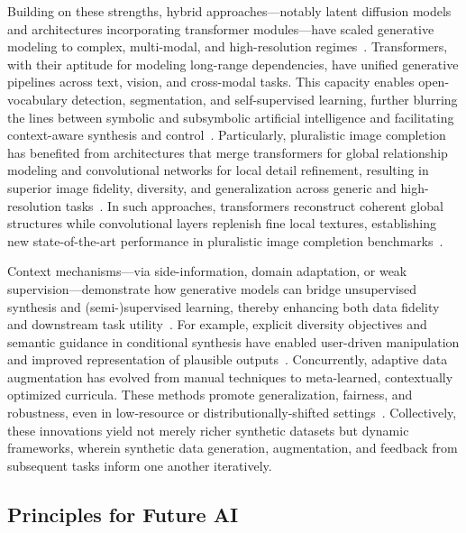 \documentclass[sigconf]{acmart}
\begin{document}
Building on these strengths, hybrid approaches---notably latent diffusion models and architectures incorporating transformer modules---have scaled generative modeling to complex, multi-modal, and high-resolution regimes~\cite{ref97,ref102}. Transformers, with their aptitude for modeling long-range dependencies, have unified generative pipelines across text, vision, and cross-modal tasks. This capacity enables open-vocabulary detection, segmentation, and self-supervised learning, further blurring the lines between symbolic and subsymbolic artificial intelligence and facilitating context-aware synthesis and control~\cite{ref93,ref95,ref100,ref102,ref81,ref83}. Particularly, pluralistic image completion has benefited from architectures that merge transformers for global relationship modeling and convolutional networks for local detail refinement, resulting in superior image fidelity, diversity, and generalization across generic and high-resolution tasks~\cite{ref92,ref97,ref102}. In such approaches, transformers reconstruct coherent global structures while convolutional layers replenish fine local textures, establishing new state-of-the-art performance in pluralistic image completion benchmarks~\cite{ref92}.

Context mechanisms---via side-information, domain adaptation, or weak supervision---demonstrate how generative models can bridge unsupervised synthesis and (semi-)supervised learning, thereby enhancing both data fidelity and downstream task utility~\cite{ref92,ref93,ref94}. For example, explicit diversity objectives and semantic guidance in conditional synthesis have enabled user-driven manipulation and improved representation of plausible outputs~\cite{ref93}. Concurrently, adaptive data augmentation has evolved from manual techniques to meta-learned, contextually optimized curricula. These methods promote generalization, fairness, and robustness, even in low-resource or distributionally-shifted settings~\cite{ref95,ref98,ref99,ref100,ref101}. Collectively, these innovations yield not merely richer synthetic datasets but dynamic frameworks, wherein synthetic data generation, augmentation, and feedback from subsequent tasks inform one another iteratively.

\subsection{Principles for Future AI}
\end{document}
